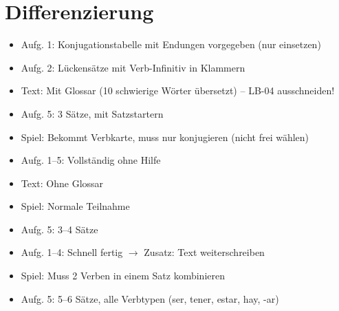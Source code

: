 \documentclass[11pt,a4paper]{article}
\begin{document}
\section*{Differenzierung}

\begin{tcolorbox}[colback=white, colframe=basis, title=\textcolor{white}{\textbf{[B] Basis}}]
\begin{itemize}[nosep]
    \item Aufg. 1: Konjugationstabelle mit Endungen vorgegeben (nur einsetzen)
    \item Aufg. 2: Lückensätze mit Verb-Infinitiv in Klammern
    \item Text: Mit Glossar (10 schwierige Wörter übersetzt) -- LB-04 ausschneiden!
    \item Aufg. 5: 3 Sätze, mit Satzstartern
    \item Spiel: Bekommt Verbkarte, muss nur konjugieren (nicht frei wählen)
\end{itemize}
\end{tcolorbox}

\begin{tcolorbox}[colback=white, colframe=standard, title=\textcolor{white}{\textbf{[S] Standard}}]
\begin{itemize}[nosep]
    \item Aufg. 1--5: Vollständig ohne Hilfe
    \item Text: Ohne Glossar
    \item Spiel: Normale Teilnahme
    \item Aufg. 5: 3--4 Sätze
\end{itemize}
\end{tcolorbox}

\begin{tcolorbox}[colback=white, colframe=erweiterung, title=\textcolor{white}{\textbf{[E] Erweiterung}}]
\begin{itemize}[nosep]
    \item Aufg. 1--4: Schnell fertig $\rightarrow$ Zusatz: Text weiterschreiben
    \item Spiel: Muss 2 Verben in einem Satz kombinieren
    \item Aufg. 5: 5--6 Sätze, alle Verbtypen (ser, tener, estar, hay, -ar)
\end{itemize}
\end{tcolorbox}

\vspace{0.5cm}

\end{document}
